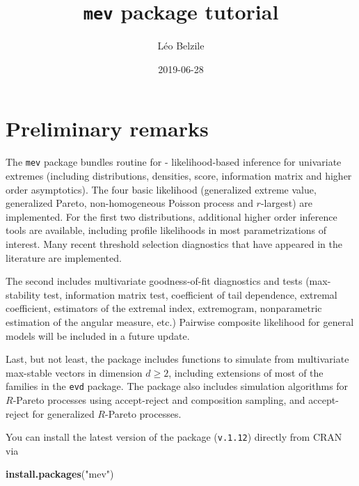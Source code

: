 \documentclass[]{book}
\title{\texttt{mev} package tutorial}
\author{Léo Belzile}
\date{2019-06-28}
\newenvironment{Shaded}{\begin{snugshade}}{\end{snugshade}}
\newcommand{\KeywordTok}[1]{\textcolor[rgb]{0.13,0.29,0.53}{\textbf{#1}}}
\newcommand{\NormalTok}[1]{#1}
\newcommand{\StringTok}[1]{\textcolor[rgb]{0.31,0.60,0.02}{#1}}
\begin{document}
\maketitle

{
\setcounter{tocdepth}{1}
\tableofcontents
}
\hypertarget{preliminary-remarks}{%
\chapter*{Preliminary remarks}\label{preliminary-remarks}}

The \texttt{mev} package bundles routine for
- likelihood-based inference for univariate extremes (including distributions, densities, score, information matrix and higher order asymptotics). The four basic likelihood (generalized extreme value, generalized Pareto, non-homogeneous Poisson process and \(r\)-largest) are implemented. For the first two distributions, additional higher order inference tools are available, including profile likelihoods in most parametrizations of interest. Many recent threshold selection diagnostics that have appeared in the literature are implemented.

The second includes multivariate goodness-of-fit diagnostics and tests (max-stability test, information matrix test, coefficient of tail dependence, extremal coefficient, estimators of the extremal index, extremogram, nonparametric estimation of the angular measure, etc.) Pairwise composite likelihood for general models will be included in a future update.

Last, but not least, the package includes functions to simulate from multivariate max-stable vectors in dimension \(d\geq 2\), including extensions of most of the families in the \texttt{evd} package. The package also includes simulation algorithms for \(R\)-Pareto processes using accept-reject and composition sampling, and accept-reject for generalized \(R\)-Pareto processes.

You can install the latest version of the package (\texttt{v.1.12}) directly from CRAN via

\begin{Shaded}
\begin{Highlighting}[]
\KeywordTok{install.packages}\NormalTok{(}\StringTok{"mev"}\NormalTok{)}
\end{Highlighting}
\end{Shaded}
\end{document}
